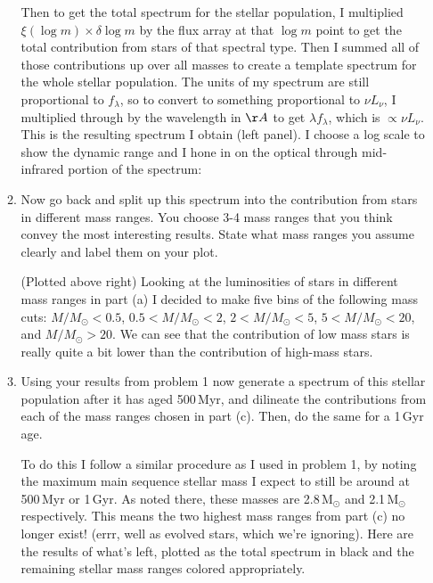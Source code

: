 \documentclass[11pt]{article}
\begin{document}
\begin{enumerate}
\begin{enumerate}
{  Then to get the total spectrum for the stellar population, I
  multiplied $\xi(\log m)\times\delta\log m$ by the flux array at that
  $\log m$ point to get the total contribution from stars of that
  spectral type.  Then I summed all of those contributions up over all
  masses to create a template spectrum for the whole stellar
  population.  The units of my spectrum are still proportional to
  $f_{\lambda}$, so to convert to something proportional to $\nu
  L_{\nu}$, I multiplied through by the wavelength in $\AA$ to get
  $\lambda f_\lambda$, which is $\propto\nu L_\nu$.  This is the
  resulting spectrum I obtain (left panel).  I choose a log scale to
  show the dynamic range and I hone in on the optical through
  mid-infrared portion of the spectrum: }

\begin{figure}[h!]
\centering
\end{figure}


  \item Now go back and split up this spectrum into the contribution
    from stars in different mass ranges.  You choose 3-4 mass ranges
    that you think convey the most interesting results.  State what
    mass ranges you assume clearly and label them on your plot.

{\color{gray} (Plotted above right) Looking at the luminosities of
  stars in different mass ranges in part (a) I decided to make five
  bins of the following mass cuts: $M/M_\odot<0.5$, $0.5<M/M_\odot<2$,
  $2<M/M_\odot<5$, $5<M/M_\odot<20$, and $M/M_\odot>20$. We can see
  that the contribution of low mass stars is really quite a bit lower
  than the contribution of high-mass stars.}

  \item Using your results from problem 1 now generate a spectrum of
    this stellar population after it has aged 500\,Myr, and dilineate
    the contributions from each of the mass ranges chosen in part
    (c).  Then, do the same for a 1\,Gyr age.

{\color{gray} To do this I follow a similar procedure as I used in
  problem 1, by noting the maximum main sequence stellar mass I expect
  to still be around at 500\,Myr or 1\,Gyr.  As noted there, these
  masses are 2.8\,M$_\odot$ and 2.1\,M$_\odot$ respectively.  This
  means the two highest mass ranges from part (c) no longer exist!
  (errr, well as evolved stars, which we're ignoring).  Here are the
  results of what's left, plotted as the total spectrum in black and
  the remaining stellar mass ranges colored appropriately.}


\end{enumerate}
\end{enumerate}
\end{document}
